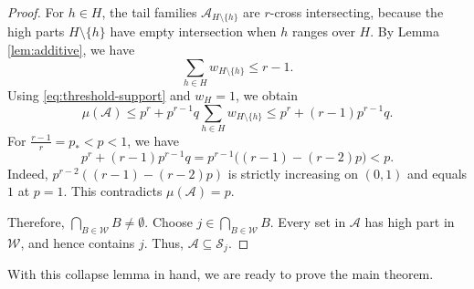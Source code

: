 \documentclass[11pt]{article}
\begin{document}
\begin{proof}
For $h\in H$, the tail families $\mathcal{A}_{H\setminus\{h\}}$ are
$r$-cross intersecting, because the high parts $H\setminus\{h\}$ have empty intersection when $h$ ranges over $H$.  By Lemma \ref{lem:additive}, we have
$$
 \sum_{h\in H}w_{H\setminus\{h\}}\le r-1.
$$
Using \eqref{eq:threshold-support} and $w_H=1$, we obtain
$$
 \mu(\mathcal{A})
 \le p^r+p^{r-1}q\sum_{h\in H}w_{H\setminus\{h\}}
 \le p^r+(r-1)p^{r-1}q.
$$
For $\frac{r-1}{r}=p_*<p<1$, we have
$$
 p^r+(r-1)p^{r-1}q=p^{r-1}\bigl((r-1)-(r-2)p\bigr)<p.
$$
Indeed, $p^{r-2}((r-1)-(r-2)p)$ is strictly increasing on $(0,1)$ and equals
$1$ at $p=1$.  This contradicts $\mu(\mathcal{A})=p$.

Therefore, $\bigcap_{B\in\mathcal{W}}B\ne\emptyset$.  Choose
$j\in\bigcap_{B\in\mathcal{W}}B$.  Every set in $\mathcal{A}$ has high part in $\mathcal{W}$, and
hence contains $j$.  Thus, $\mathcal{A}\subseteq\mathcal{S}_j$.
\end{proof}

With this collapse lemma in hand, we are ready to prove the main theorem.
\end{document}
